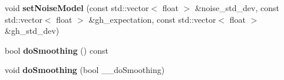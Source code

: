 \begin{DoxyCompactItemize}
\hypertarget{classskl_1_1_tex_cut_a114d5710f0b2b6ba04c54f6a4df7f02f}{}\label{classskl_1_1_tex_cut_a114d5710f0b2b6ba04c54f6a4df7f02f} 
void {\bfseries set\+Noise\+Model} (const std\+::vector$<$ float $>$ \&noise\+\_\+std\+\_\+dev, const std\+::vector$<$ float $>$ \&gh\+\_\+expectation, const std\+::vector$<$ float $>$ \&gh\+\_\+std\+\_\+dev)
\item 
\hypertarget{classskl_1_1_tex_cut_a9e61e905d329f9f6333e7a95c249309f}{}\label{classskl_1_1_tex_cut_a9e61e905d329f9f6333e7a95c249309f} 
bool {\bfseries do\+Smoothing} () const
\item 
\hypertarget{classskl_1_1_tex_cut_aa51a66fef188c2570a5c4683087659b1}{}\label{classskl_1_1_tex_cut_aa51a66fef188c2570a5c4683087659b1} 
void {\bfseries do\+Smoothing} (bool \+\_\+\+\_\+do\+Smoothing)
\end{DoxyCompactItemize}
